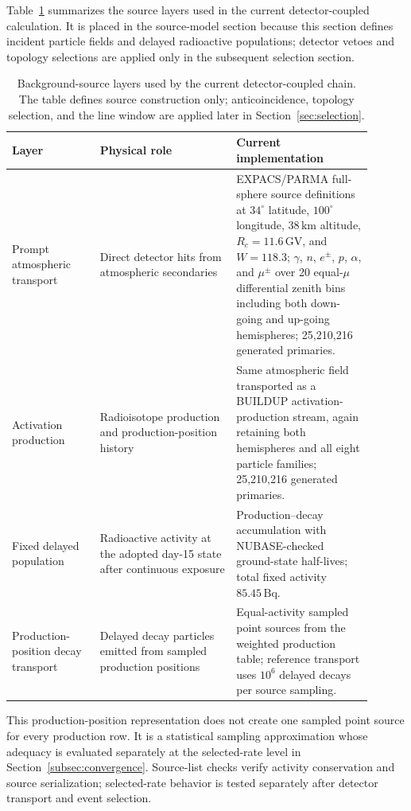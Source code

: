 \documentclass[11pt]{article}
\begin{document}
Table~\ref{tab:background_source_model} summarizes the source layers used in the
current detector-coupled calculation. It is placed in the source-model section
because this section defines incident particle fields and delayed radioactive
populations; detector vetoes and topology selections are applied only in the
subsequent selection section.

\begin{table}[t]
\centering
\caption{Background-source layers used by the current detector-coupled chain. The table defines source construction only; anticoincidence, topology selection, and the line window are applied later in Section~\ref{sec:selection}.}
\label{tab:background_source_model}
\begin{tabular}{p{0.22\linewidth}p{0.34\linewidth}p{0.34\linewidth}}
\hline
Layer & Physical role & Current implementation \\
\hline
Prompt atmospheric transport & Direct detector hits from atmospheric secondaries & EXPACS/PARMA full-sphere source definitions at $34^\circ$ latitude, $100^\circ$ longitude, $38\,\mathrm{km}$ altitude, $R_c=11.6\,\mathrm{GV}$, and $W=118.3$; $\gamma$, $n$, $e^\pm$, $p$, $\alpha$, and $\mu^\pm$ over 20 equal-$\mu$ differential zenith bins including both down-going and up-going hemispheres; 25,210,216 generated primaries. \\
Activation production & Radioisotope production and production-position history & Same atmospheric field transported as a BUILDUP activation-production stream, again retaining both hemispheres and all eight particle families; 25,210,216 generated primaries. \\
Fixed delayed population & Radioactive activity at the adopted day-15 state after continuous exposure & Production--decay accumulation with NUBASE-checked ground-state half-lives; total fixed activity $85.45\,\mathrm{Bq}$. \\
Production-position decay transport & Delayed decay particles emitted from sampled production positions & Equal-activity sampled point sources from the weighted production table; reference transport uses $10^6$ delayed decays per source sampling. \\
\hline
\end{tabular}
\end{table}

This production-position representation does not create one sampled point source
for every production row. It is a statistical sampling approximation whose
adequacy is evaluated separately at the selected-rate level in
Section~\ref{subsec:convergence}. Source-list checks verify activity
conservation and source serialization; selected-rate behavior is tested
separately after detector transport and event selection.
\end{document}
